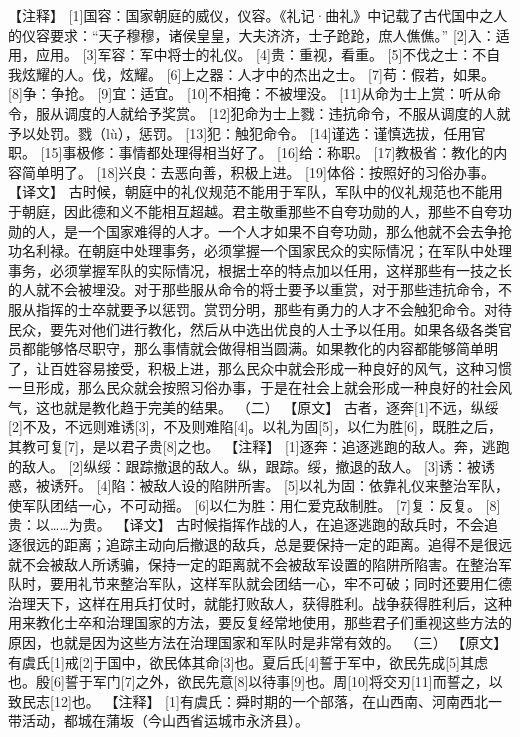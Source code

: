 \documentclass[a4paper,12pt,UTF8,twoside]{ctexbook}
\begin{document}
【注释】
[1]国容：国家朝庭的威仪，仪容。《礼记·曲礼》中记载了古代国中之人的仪容要求：“天子穆穆，诸侯皇皇，大夫济济，士子跄跄，庶人僬僬。”
[2]入：适用，应用。
[3]军容：军中将士的礼仪。
[4]贵：重视，看重。
[5]不伐之士：不自我炫耀的人。伐，炫耀。
[6]上之器：人才中的杰出之士。
[7]苟：假若，如果。
[8]争：争抢。
[9]宜：适宜。
[10]不相掩：不被埋没。
[11]从命为士上赏：听从命令，服从调度的人就给予奖赏。
[12]犯命为士上戮：违抗命令，不服从调度的人就予以处罚。戮（lù），惩罚。
[13]犯：触犯命令。
[14]谨选：谨慎选拔，任用官职。
[15]事极修：事情都处理得相当好了。
[16]给：称职。
[17]教极省：教化的内容简单明了。
[18]兴良：去恶向善，积极上进。
[19]体俗：按照好的习俗办事。
【译文】
古时候，朝庭中的礼仪规范不能用于军队，军队中的仪礼规范也不能用于朝庭，因此德和义不能相互超越。君主敬重那些不自夸功勋的人，那些不自夸功勋的人，是一个国家难得的人才。一个人才如果不自夸功勋，那么他就不会去争抢功名利禄。在朝庭中处理事务，必须掌握一个国家民众的实际情况；在军队中处理事务，必须掌握军队的实际情况，根据士卒的特点加以任用，这样那些有一技之长的人就不会被埋没。对于那些服从命令的将士要予以重赏，对于那些违抗命令，不服从指挥的士卒就要予以惩罚。赏罚分明，那些有勇力的人才不会触犯命令。对待民众，要先对他们进行教化，然后从中选出优良的人士予以任用。如果各级各类官员都能够恪尽职守，那么事情就会做得相当圆满。如果教化的内容都能够简单明了，让百姓容易接受，积极上进，那么民众中就会形成一种良好的风气，这种习惯一旦形成，那么民众就会按照习俗办事，于是在社会上就会形成一种良好的社会风气，这也就是教化趋于完美的结果。
（二）
【原文】
古者，逐奔[1]不远，纵绥[2]不及，不远则难诱[3]，不及则难陷[4]。以礼为固[5]，以仁为胜[6]，既胜之后，其教可复[7]，是以君子贵[8]之也。
【注释】
[1]逐奔：追逐逃跑的敌人。奔，逃跑的敌人。
[2]纵绥：跟踪撤退的敌人。纵，跟踪。绥，撤退的敌人。
[3]诱：被诱惑，被诱歼。
[4]陷：被敌人设的陷阱所害。
[5]以礼为固：依靠礼仪来整治军队，使军队团结一心，不可动摇。
[6]以仁为胜：用仁爱克敌制胜。
[7]复：反复。
[8]贵：以……为贵。
【译文】
古时候指挥作战的人，在追逐逃跑的敌兵时，不会追逐很远的距离；追踪主动向后撤退的敌兵，总是要保持一定的距离。追得不是很远就不会被敌人所诱骗，保持一定的距离就不会被敌军设置的陷阱所陷害。在整治军队时，要用礼节来整治军队，这样军队就会团结一心，牢不可破；同时还要用仁德治理天下，这样在用兵打仗时，就能打败敌人，获得胜利。战争获得胜利后，这种用来教化士卒和治理国家的方法，要反复经常地使用，那些君子们重视这些方法的原因，也就是因为这些方法在治理国家和军队时是非常有效的。
（三）
【原文】
有虞氏[1]戒[2]于国中，欲民体其命[3]也。夏后氏[4]誓于军中，欲民先成[5]其虑也。殷[6]誓于军门[7]之外，欲民先意[8]以待事[9]也。周[10]将交刃[11]而誓之，以致民志[12]也。
【注释】
[1]有虞氏：舜时期的一个部落，在山西南、河南西北一带活动，都城在蒲坂（今山西省运城市永济县）。
\end{document}
